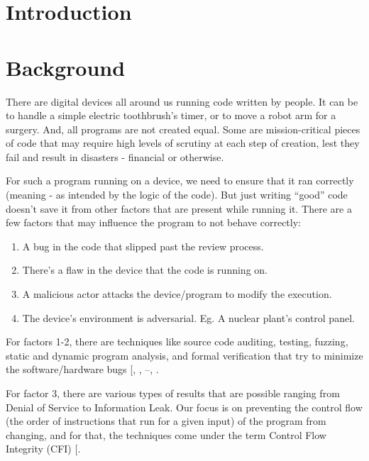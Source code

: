 \documentclass[a4paper, nobind]{templates/ociamthesis}
\providecommand{\tightlist}{%
  \setlength{\itemsep}{0pt}\setlength{\parskip}{0pt}}
\begin{document}
\chapter*{Introduction}\label{introduction}

\adjustmtc
{}

\chapter{Background}\label{background}

\minitoc 

There are digital devices all around us running code written by people. It can be
to handle a simple electric toothbrush's timer, or to move a robot arm for a surgery.
And, all programs are not created equal. Some are mission-critical pieces of code that
may require high levels of scrutiny at each step of creation, lest they fail and
result in disasters - financial or otherwise.

For such a program running on a device, we need to ensure that it ran correctly
(meaning - as intended by the logic of the code).
But just writing ``good'' code doesn't save it from other factors that are present while running it.
There are a few factors that may influence the program to not behave correctly:

\begin{enumerate}
\def\labelenumi{\arabic{enumi}.}
\tightlist
\item
  A bug in the code that slipped past the review process.
\item
  There's a flaw in the device that the code is running on.
\item
  A malicious actor attacks the device/program to modify the execution.
\item
  The device's environment is adversarial. Eg. A nuclear plant's control panel.
\end{enumerate}

For factors 1-2, there are techniques like source code auditing, testing,
fuzzing, static and dynamic program analysis, and formal verification that try
to minimize the software/hardware bugs {[}, , --, \citeproc{ref-quinlan2009source}{45}{]}.

For factor 3, there are various types of results that are possible ranging from
Denial of Service to Information Leak.
Our focus is on preventing the control flow (the order of instructions that run for a given input)
of the program from changing, and for that, the techniques come under the term
Control Flow Integrity (CFI) {[}\citeproc{ref-sok}{5}{]}.
\end{document}
